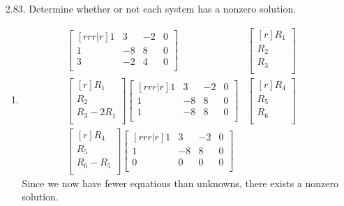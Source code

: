 \documentclass[12pt]{article}
\begin{document}
\begin{enumerate}
\begin{enumerate}
\begin{enumerate}
		\end{enumerate}
	\end{enumerate}
\medskip
\item [2.83.] Determine whether or not each system has a nonzero solution.
	\begin{enumerate}
	\item
	\begin{align*}
	\begin{bmatrix}[rrr|r]
	1 & 3 & -2 & 0\\
	1 & -8 & 8 & 0\\
	3 & -2 & 4 & 0\\
	\end{bmatrix}&
	\begin{bmatrix}[r]
	R_1\\ R_2\\ R_3\\
	\end{bmatrix}\\
	\begin{bmatrix}[r]
	R_1\\
	R_2\\
	R_3 - 2R_1\\
	\end{bmatrix}
	\begin{bmatrix}[rrr|r]
	1 & 3 & -2 & 0\\
	1 & -8 & 8 & 0\\
	1 & -8 & 8 & 0\\
	\end{bmatrix}&
	\begin{bmatrix}[r]
	R_4\\ R_5\\ R_6\\
	\end{bmatrix}\\
	\begin{bmatrix}[r]
	R_4\\
	R_5\\
	R_6 - R_5\\
	\end{bmatrix}
	\begin{bmatrix}[rrr|r]
	1 & 3 & -2 & 0\\
	1 & -8 & 8 & 0\\
	0 & 0 & 0 & 0\\
	\end{bmatrix}&
	\end{align*}
	Since we now have fewer equations than unknowns, there exists a nonzero solution.
	\medskip
	

\end{enumerate}
\end{enumerate}
\end{document}
